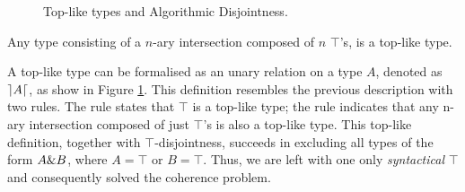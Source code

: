 \begin{figure}[h]


  \caption{Top-like types and Algorithmic Disjointness.}
  \label{fig:tltypesdis}
\end{figure}

\begin{definition}
  Any type consisting of a $n$-ary intersection composed of $n$ $\top$'s, is a top-like type. 
\end{definition}

A top-like type can be formalised as an unary relation on a type $A$, denoted as $\rceil A \lceil$, as show in 
Figure \ref{fig:tltypesdis}.
This definition resembles the previous description with two rules.
The rule  states that $\top$ is a top-like type; 
the rule  indicates that any n-ary intersection composed of just $\top$'s is also a top-like type.
This top-like definition, together with $\top$-disjointness, 
succeeds in excluding all types of the form $A \& B$, where $A = \top$ or $B = \top$.
Thus, we are left with one only \emph{syntactical} $\top$ and consequently solved the coherence problem.

